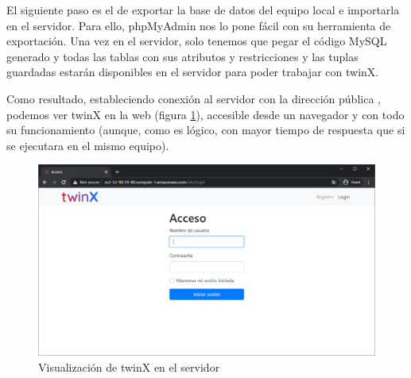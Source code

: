 El siguiente paso es el de exportar la base de datos del equipo local e importarla en el servidor. Para ello, phpMyAdmin nos lo pone fácil con su herramienta de exportación. Una vez en el servidor, solo tenemos que pegar el código MySQL generado y todas las tablas con sus atributos y restricciones y las tuplas guardadas estarán disponibles en el servidor para poder trabajar con twinX.

Como resultado, estableciendo conexión al servidor con la dirección pública \cite{twinx}, podemos ver twinX en la web (figura \ref{fig:twinx}), accesible desde un navegador y con todo su funcionamiento (aunque, como es lógico, con mayor tiempo de respuesta que si se ejecutara en el mismo equipo).

\begin{figure}
	\centering
	\includegraphics[width=\linewidth]{img/twinx_desplegado}
	\caption{Visualización de twinX en el servidor}
	\label{fig:twinx}
\end{figure}


